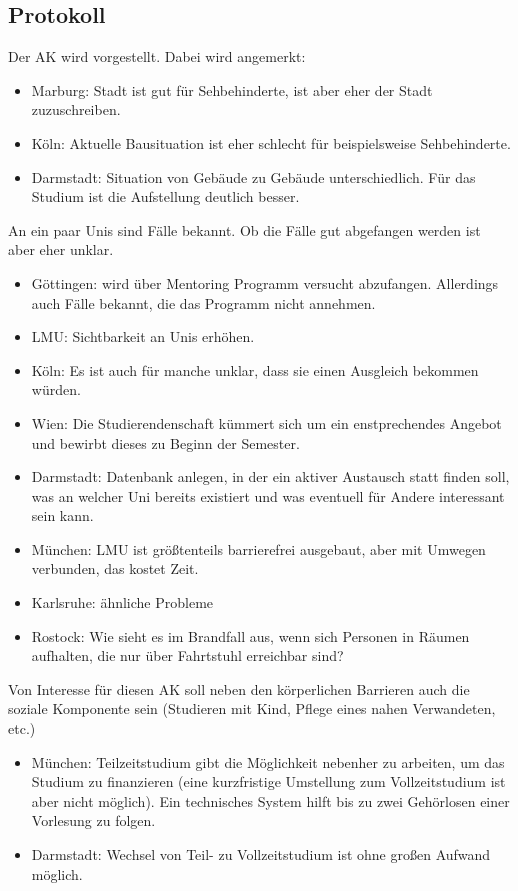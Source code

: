   \subsection*{Protokoll}
    Der AK wird vorgestellt. Dabei wird angemerkt:
    \begin{itemize}
      \item Marburg: Stadt ist gut für Sehbehinderte, ist aber eher der Stadt zuzuschreiben.
      \item Köln: Aktuelle Bausituation ist eher schlecht für beispielsweise Sehbehinderte.
      \item Darmstadt: Situation von Gebäude zu Gebäude unterschiedlich. Für das Studium ist die Aufstellung deutlich besser.
    \end{itemize}

    An ein paar Unis sind Fälle bekannt. Ob die Fälle gut abgefangen werden ist aber eher unklar.
    \begin{itemize}
      \item Göttingen: wird über Mentoring Programm versucht abzufangen. Allerdings auch Fälle bekannt, die das Programm nicht annehmen.
      \item LMU: Sichtbarkeit an Unis erhöhen.
      \item Köln: Es ist auch für manche unklar, dass sie einen Ausgleich bekommen würden.
      \item Wien: Die Studierendenschaft kümmert sich um ein enstprechendes Angebot und bewirbt dieses zu Beginn der Semester.
      \item Darmstadt: Datenbank anlegen, in der ein aktiver Austausch statt finden soll, was an welcher Uni bereits existiert und was eventuell für Andere interessant sein kann.
      \item München: LMU ist größtenteils barrierefrei ausgebaut, aber mit Umwegen verbunden, das kostet Zeit.
      \item Karlsruhe: ähnliche Probleme
      \item Rostock: Wie sieht es im Brandfall aus, wenn sich Personen in Räumen aufhalten, die nur über Fahrtstuhl erreichbar sind?
    \end{itemize}

    Von Interesse für diesen AK soll neben den körperlichen Barrieren auch die soziale Komponente sein (Studieren mit Kind, Pflege eines nahen Verwandeten, etc.)
    \begin{itemize}
      \item München: Teilzeitstudium gibt die Möglichkeit nebenher zu arbeiten, um das Studium zu finanzieren (eine kurzfristige Umstellung zum Vollzeitstudium ist aber nicht möglich). Ein technisches System hilft bis zu zwei Gehörlosen einer Vorlesung zu folgen.
      \item Darmstadt: Wechsel von Teil- zu Vollzeitstudium ist ohne großen Aufwand möglich.
    \end{itemize}

